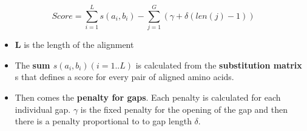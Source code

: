 \begin{equation}
Score = \sum_{i=1}^{L} s(a_i,b_i) - \sum_{j=1}^{G} (\gamma + \delta(len(j)-1))
\end{equation}

\begin{itemize}
	\item \textbf{L} is the length of the alignment
	\item The \textbf{sum $ s(a_i,b_i) (i=1..L) $} is calculated from the \textbf{substitution 
matrix} s that defines a score for every pair of aligned amino acids.
	\item Then comes the \textbf{penalty for gaps}. Each penalty is calculated for each 
individual gap. \textbf{$\gamma$} is the fixed penalty for the opening of the gap and then 
there is a penalty proportional to to gap length \textbf{$\delta$}.
\end{itemize}
